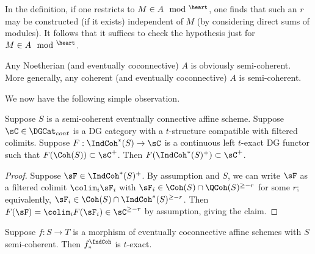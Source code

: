 \begin{rem}
\notready\label{r:semi-coh-ab}

In the definition, if one restricts to $M \in A\mod^{\heart}$,
one finds that such an $r$ may be constructed (if it exists)
independent of $M$ (by considering direct sums of modules).
It follows that it suffices to check the hypothesis just for $M \in A\mod^{\heart}$.

\end{rem}

\begin{example}
\notready

Any Noetherian (and eventually coconnective)
$A$ is obviously semi-coherent. More generally, any
coherent (and eventually coconnective) $A$ is semi-coherent.

\end{example}

We now have the following simple observation.

\begin{lem}
\notready\label{l:semi-coh-functor}

Suppose $S$ is a semi-coherent eventually connective affine scheme.
Suppose $\sC \in \DGCat_{cont}$ is a DG category with a $t$-structure
compatible with filtered colimits.
Suppose $F:\IndCoh^*(S) \to \sC$ is a continuous left $t$-exact DG functor
such that $F(\Coh(S)) \subset \sC^+$.
Then $F(\IndCoh^*(S)^+) \subset \sC^+$.

\end{lem}

\begin{proof}

Suppose $\sF \in \IndCoh^*(S)^+$. By assumption and $S$, we can write
$\sF$ as a filtered colimit $\colim_i \sF_i$ with
$\sF_i \in \Coh(S) \cap \QCoh(S)^{\geq -r}$ for
some $r$; equivalently, $\sF_i \in \Coh(S) \cap \IndCoh^*(S)^{\geq -r}$.
Then $F(\sF) = \colim_i F(\sF_i) \in \sC^{\geq -r}$ by assumption, giving
the claim.

\end{proof}

\begin{cor}
\notready\label{c:semi-coh-push}

Suppose $f:S \to T$ is a morphism of eventually coconnective affine schemes
with $S$ semi-coherent. Then $f_*^{\IndCoh}$ is $t$-exact.

\end{cor}

